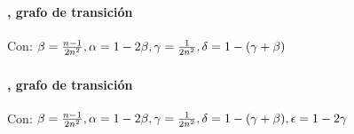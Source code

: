 \documentclass[../main.tex]{subfiles}
\begin{document}
\begin{frame}
  \frametitle{\SECTIOND}
  \framesubtitle{\EJE, grafo de transición}

  Con: \(\beta = \frac{n-1}{2n^{2}}, \alpha = 1 - 2\beta, \gamma = \frac{1}{2n^{2}}, \delta = 1 - (\gamma + \beta)\)

  \begin{figure}[H]
    \centering
  \end{figure}
\end{frame}

\begin{frame}
  \frametitle{\SECTIOND}
  \framesubtitle{\EJE, grafo de transición}

  Con: \(\beta = \frac{n-1}{2n^{2}}, \alpha = 1 - 2\beta, \gamma = \frac{1}{2n^{2}}, \delta = 1 - (\gamma + \beta), \epsilon = 1 - 2\gamma\)

  \begin{figure}[H]
    \centering
  \end{figure}
\end{frame}
\end{document}
